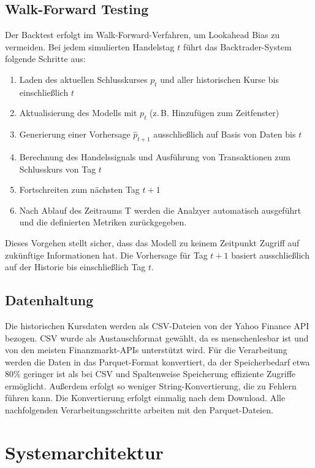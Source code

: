 \subsection{Walk-Forward Testing}\label{subsec:walkforward}
Der Backtest erfolgt im Walk-Forward-Verfahren, um Lookahead Bias zu vermeiden. Bei jedem simulierten Handelstag $t$ führt das Backtrader-System folgende Schritte aus:

\begin{enumerate}
    \item Laden des aktuellen Schlusskurses $p_t$ und aller historischen Kurse bis einschließlich $t$
    \item Aktualisierung des Modells mit $p_t$ (z.\,B. Hinzufügen zum Zeitfenster)
    \item Generierung einer Vorhersage $\hat{p}_{t+1}$ ausschließlich auf Basis von Daten bis $t$
    \item Berechnung des Handelssignals und Ausführung von Transaktionen zum Schlusskurs von Tag $t$
    \item Fortschreiten zum nächsten Tag $t+1$
    \item Nach Ablauf des Zeitraums T werden die Analzyer automatisch ausgeführt und die definierten Metriken zurückgegeben.
\end{enumerate}

Dieses Vorgehen stellt sicher, dass das Modell zu keinem Zeitpunkt Zugriff auf zukünftige Informationen hat. Die Vorhersage für Tag $t+1$ basiert ausschließlich auf der Historie bis einschließlich Tag $t$.

\subsection{Datenhaltung}\label{subsec:datenhaltung}
Die historischen Kursdaten werden als CSV-Dateien von der Yahoo Finance API bezogen. CSV wurde als Austauschformat gewählt, da es menschenlesbar ist und von den meisten Finanzmarkt-APIs unterstützt wird. Für die Verarbeitung werden die Daten in das Parquet-Format konvertiert, da der Speicherbedarf etwa 80\% geringer ist als bei CSV und Spaltenweise Speicherung effiziente Zugriffe ermöglicht. Außerdem erfolgt so weniger String-Konvertierung, die zu Fehlern führen kann. Die Konvertierung erfolgt einmalig nach dem Download. Alle nachfolgenden Verarbeitungsschritte arbeiten mit den Parquet-Dateien.

\section{Systemarchitektur}\label{sec:systemarchitektur}

